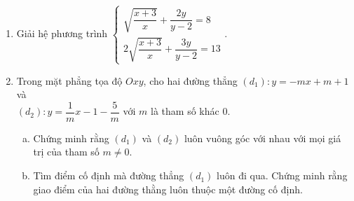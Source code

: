 \begin{ex}%
	\begin{enumerate}[1)]
		\item Giải hệ phương trình $ \begin{cases}
		\sqrt{\dfrac{x+3}{x}}+\dfrac{2y}{y-2} = 8\\2\sqrt{\dfrac{x+3}{x}} + \dfrac{3y}{y-2} = 13
		\end{cases} $.
		\item Trong mặt phẳng tọa độ $ Oxy $, cho hai đường thẳng $ (d_1)\colon y = -mx + m +1 $ và \\ $ (d_2)\colon y = \dfrac{1}{m}x-1-\dfrac{5}{m} $ với $ m $ là tham số khác $ 0 $.
		\begin{enumerate}[a)]
			\item Chứng minh rằng $ (d_1) $ và $ (d_2) $ luôn vuông góc với nhau với mọi giá trị của tham số $ m\ne 0 $.
			\item Tìm điểm cố định mà đường thẳng $ (d_1) $ luôn đi qua. Chứng minh rằng giao điểm của hai đường thằng luôn thuộc một đường cố định.
		\end{enumerate}
	\end{enumerate}
\end{ex}

